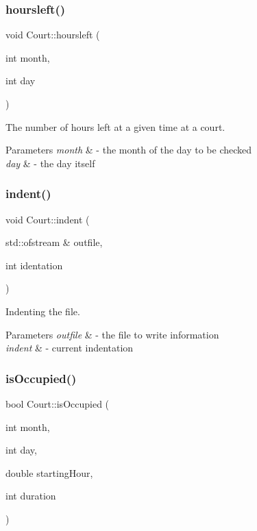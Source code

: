 \subsubsection{\texorpdfstring{hoursleft()}{hoursleft()}}
{\footnotesize\ttfamily void Court\+::hoursleft (\begin{DoxyParamCaption}\item[{int}]{month,  }\item[{int}]{day }\end{DoxyParamCaption})}



The number of hours left at a given time at a court. 


\begin{DoxyParams}{Parameters}
{\em month} & -\/ the month of the day to be checked \\
\hline
{\em day} & -\/ the day itself \\
\hline
\end{DoxyParams}
\mbox{\label{class_court_ae08f3e2f1119073fffc251fc1e725550}} 
\subsubsection{\texorpdfstring{indent()}{indent()}}
{\footnotesize\ttfamily void Court\+::indent (\begin{DoxyParamCaption}\item[{std\+::ofstream \&}]{outfile,  }\item[{int}]{identation }\end{DoxyParamCaption})}



Indenting the file. 


\begin{DoxyParams}{Parameters}
{\em outfile} & -\/ the file to write information \\
\hline
{\em indent} & -\/ current indentation \\
\hline
\end{DoxyParams}
\mbox{\label{class_court_ae4536a06bcc2aec8a144d134ae64f2e6}} 
\subsubsection{\texorpdfstring{is\+Occupied()}{isOccupied()}}
{\footnotesize\ttfamily bool Court\+::is\+Occupied (\begin{DoxyParamCaption}\item[{int}]{month,  }\item[{int}]{day,  }\item[{double}]{starting\+Hour,  }\item[{int}]{duration }\end{DoxyParamCaption})}



